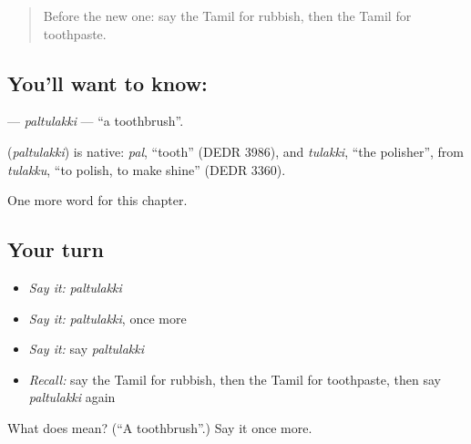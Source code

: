 \label{lesson:TA-C213-paltulakki}



\begin{quote}
Before the new one: say the Tamil for rubbish, then the Tamil for toothpaste.
\end{quote}

\subsection*{You'll want to know: }
\textbf{} — \emph{paltulakki} — \textquotedblleft{}a toothbrush\textquotedblright{}.

\begin{cousinweb}
\textbf{} (\emph{paltulakki}) is native: \emph{pal}, \textquotedblleft{}tooth\textquotedblright{} (DEDR 3986), and \emph{tulakki}, \textquotedblleft{}the polisher\textquotedblright{}, from \emph{tulakku}, \textquotedblleft{}to polish, to make shine\textquotedblright{} (DEDR 3360).
\end{cousinweb}

\begin{grammarlens}[title={What you've built}]
One more word for this chapter.
\end{grammarlens}

\subsection*{Your turn}
\begin{itemize}
\raggedright
  \item \emph{Say it:} \emph{paltulakki}
  \item \emph{Say it:} \emph{paltulakki}, once more
  \item \emph{Say it:} say \emph{paltulakki}
  \item \emph{Recall:} say the Tamil for rubbish, then the Tamil for toothpaste, then say \emph{paltulakki} again
\end{itemize}

\begin{tcolorbox}[breakable,colback=teal!4,colframe=teal!35!black,title={Before you move on}]
What does  mean? (\textquotedblleft{}A toothbrush\textquotedblright{}.) Say it once more.
\end{tcolorbox}
